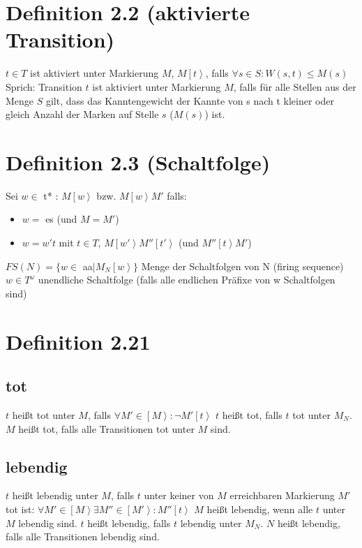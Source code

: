 \documentclass[12pt]{scrreprt}
\begin{document}
\section{Definition 2.2 (aktivierte Transition)}
$t \in T$ ist aktiviert unter Markierung $M$, $M\left[t\right>$, falls $\forall s \in S:W(s,t) \leq M(s)$\newline
	Sprich: Transition $t$ ist aktiviert unter Markierung $M$, falls für alle Stellen aus der Menge $S$ gilt, dass das Kanntengewicht der Kannte von s nach t kleiner oder gleich Anzahl der Marken auf Stelle $s$ ($M(s)$) ist.
\section{Definition 2.3 (Schaltfolge)}
Sei $w \in$ \ac{t*} : $M\left[w\right>$ bzw. $M\left[w\right>M'$ falls:
\begin{itemize}
	\item $w =$ \ac{es} (und $M=M'$)
	\item $w = w't$ mit $t \in T$, $M\left[w'\right>M''\left[t'\right>$ (und $M''\left[t\right>M'$)
\end{itemize}
$FS(N)=\{w \in$ \ac{aa}$ \mid M_N \left[w\right>\}$ Menge der Schaltfolgen von N (firing sequence)\newline
$w \in T^\omega$ unendliche Schaltfolge (falls alle endlichen Präfixe von w Schaltfolgen sind)

\section{Definition 2.21}
\subsection{tot}
$t$ heißt tot unter $M$, falls $\forall M' \in \left[M\right> : \neg M'\left[t\right>$\newline
$t$ heißt tot, falls $t$ tot unter $M_N$.\newline
$M$ heißt tot, falls alle Transitionen tot unter $M$ sind.
\newpage
\subsection{lebendig}
$t$ heißt lebendig unter $M$, falls $t$ unter keiner von $M$ erreichbaren Markierung $M'$ tot ist:\newline
$\forall M' \in \left[M\right>\exists M'' \in \left[M'\right> :  M'' \left[t\right>$\newline
$M$ heißt lebendig, wenn alle $t$ unter $M$ lebendig sind.\newline
$t$ heißt lebendig, falls $t$ lebendig unter $M_N$.\newline
$N$ heißt lebendig, falls alle Transitionen lebendig sind.
\end{document}
